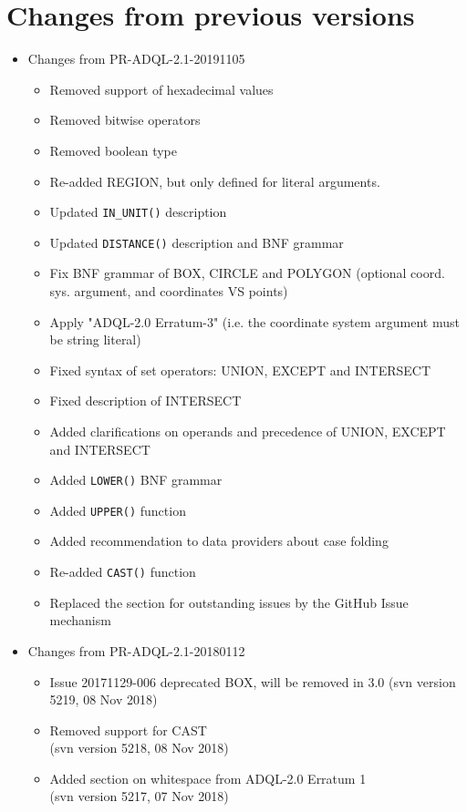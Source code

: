 \documentclass[11pt,a4paper]{ivoa}
\begin{document}
\clearpage %
\section{Changes from previous versions}
\label{sec:changes}

\begin{itemize}

    \item Changes from PR-ADQL-2.1-20191105
        \begin{itemize}
            \item Removed support of hexadecimal values
            \item Removed bitwise operators
            \item Removed boolean type
            \item Re-added REGION, but only defined for literal
            arguments.
            \item Updated \verb:IN_UNIT(): description
            \item Updated \verb:DISTANCE(): description and BNF grammar
            \item Fix BNF grammar of BOX, CIRCLE and POLYGON (optional coord.
            sys. argument, and coordinates VS points)
            \item Apply "ADQL-2.0 Erratum-3" (i.e. the coordinate system
            argument must be string literal)
            \item Fixed syntax of set operators: UNION, EXCEPT and INTERSECT
            \item Fixed description of INTERSECT
            \item Added clarifications on operands and precedence of UNION, EXCEPT and INTERSECT
            \item Added \verb:LOWER(): BNF grammar
            \item Added \verb:UPPER(): function
            \item Added recommendation to data providers about case folding
            \item Re-added \verb:CAST(): function
            \item Replaced the section for outstanding issues by the GitHub Issue mechanism
        \end{itemize}

    \item Changes from PR-ADQL-2.1-20180112
        \begin{itemize}
            \item Issue 20171129-006 deprecated BOX, will be removed in 3.0
            (svn version 5219, 08 Nov 2018)
            \item Removed support for CAST\\
            (svn version 5218, 08 Nov 2018)
            \item Added section on whitespace from ADQL-2.0 Erratum 1\\
            (svn version 5217, 07 Nov 2018)
        \end{itemize}


\end{itemize}
\end{document}
